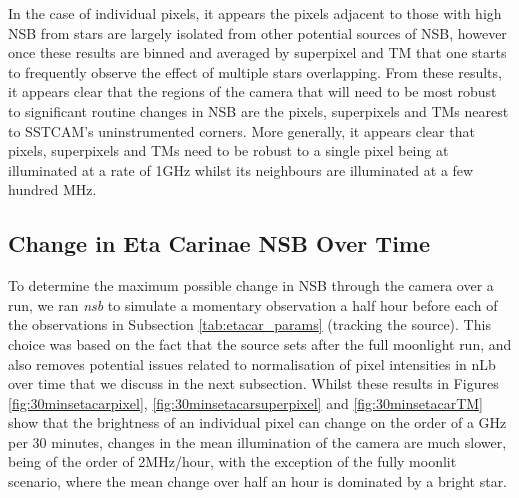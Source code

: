 In the case of individual pixels, it appears the pixels adjacent to those with high NSB from stars are largely isolated from other potential sources of NSB, however once these results are binned and averaged by superpixel and TM that one starts to frequently observe the effect of multiple stars overlapping. From these results, it appears clear that the regions of the camera that will need to be most robust to significant routine changes in NSB are the pixels, superpixels and TMs nearest to SSTCAM's uninstrumented corners. More generally, it appears clear that pixels, superpixels and TMs need to be robust to a single pixel being at illuminated at a rate of 1GHz whilst its neighbours are illuminated at a few hundred MHz.

\subsection{Change in Eta Carinae NSB Over Time}
To determine the maximum possible change in NSB through the camera over a run, we ran \textit{nsb} to simulate a momentary observation a half hour before each of the observations in Subsection \ref{tab:etacar_params} (tracking the source). This choice was based on the fact that the source sets after the full moonlight run, and also removes potential issues related to normalisation of pixel intensities in nLb over time that we discuss in the next subsection. Whilst these results in Figures \ref{fig:30minsetacarpixel}, \ref{fig:30minsetacarsuperpixel} and \ref{fig:30minsetacarTM} show that the brightness of an individual pixel can change on the order of a GHz per 30 minutes, changes in the mean illumination of the camera are much slower, being of the order of 2MHz/hour, with the exception of the fully moonlit scenario, where the mean change over half an hour is dominated by a bright star.

